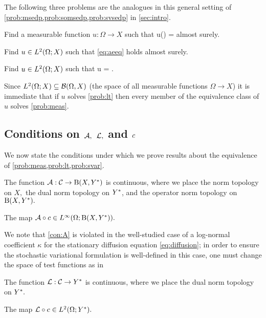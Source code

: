 The following three problems are the analogues in this general setting of \cref{prob:msedp,prob:somsedp,prob:svsedp} in \cref{sec:intro}.

\label{prob:meas}
Find a measurable function $u:\Omega \rightarrow X$ such that 
\beq\label{eq:aeeq}
\Acomega u(\omega) = \Lcomega \tin \Ys
\eeq
almost surely.
\eprobvar

\label{prob:lt}
Find $u \in \LtOX$ such that \eqref{eq:aeeq} holds almost surely.
\eprobvar

\label{prob:svar}
Find $u \in \LtOX$ such that
\beq\label{eq:stoeq}
\SAc u = \SLc \tin \LtOYas.
\eeq
\eprobvar

\label{rem:imm}
Since $\LtOX \subseteq \BorelOX$ (the space of all measurable functions $\Omega\rightarrow X$)
it is immediate that if $u$ solves \cref{prob:lt} then every member of the equivalence class of $u$ solves \cref{prob:meas}.
\ere

\subsection{Conditions on $\mathcal A,$ $\mathcal L,$ and $c$}\label{sec:cons}
We now state the conditions under which we prove results about the equivalence of \cref{prob:meas,prob:lt,prob:svar}.


 \label{con:coeffstoform}
The function $\toform:\cC \rightarrow \homspace$ is continuous, where we place the norm topology on $X,$ the dual norm topology on $Y^{*}$, and the operator norm topology on $\homspace.$
\econvar

\label{con:A}
The map $\toform\circ\coeff \in \LiOhomspace.$
\econvar


We note that \cref{con:A} is violated in the well-studied case of a log-normal coefficient $\kappa$ for the stationary diffusion equation \eqref{eq:diffusion}; in order to ensure the stochastic variational formulation is well-defined in this case, one must change the space of test functions as in \cite{Gi:10,MuSt:11}

 \label{con:coeffstofunc}
The function $\mathcal L:\mathcal C \rightarrow Y^{*}$  is continuous, where we place the dual norm topology on $Y^{*}.$
\econvar

\label{con:L}
The map $\rhs\circ \coeff \in \LtOYs.$
\econvar

